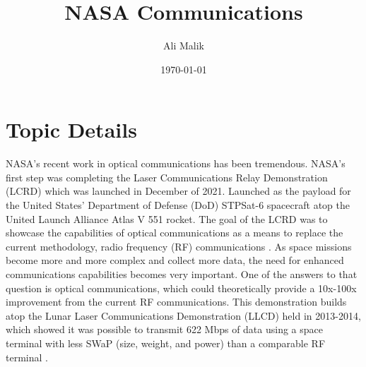 \documentclass[english]{article}
\title{NASA Communications}
\author{Ali Malik}
\date{\today}
\begin{document}
\maketitle

\section*{Topic Details}

NASA's recent work in optical communications has been tremendous. NASA's first step was completing the Laser Communications Relay Demonstration (LCRD) which was launched in December of 2021. Launched as the payload for the United States' Department of Defense (DoD) STPSat-6 spacecraft atop the United Launch Alliance Atlas V 551 rocket. The goal of the LCRD was to showcase the capabilities of optical communications as a means to replace the current methodology, radio frequency (RF) communications \cite{lcrd}. As space missions become more and more complex and collect more data, the need for enhanced communications capabilities becomes very important. One of the answers to that question is optical communications, which could theoretically provide a 10x-100x improvement from the current RF communications. This demonstration builds atop the Lunar Laser Communications Demonstration (LLCD) held in 2013-2014, which showed it was possible to transmit 622 Mbps of data using a space terminal with less SWaP (size, weight, and power) than a comparable RF terminal \cite{llcd}. 




\end{document}
